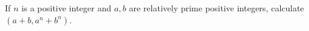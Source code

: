 If $n$ is a positive integer and $a, b$ are relatively prime positive integers, calculate $(a + b,a^n + b^n)$.